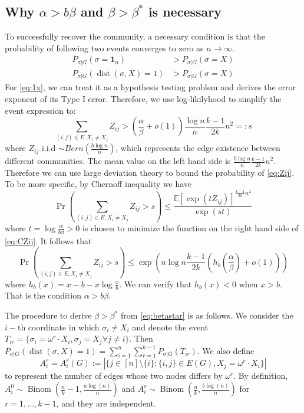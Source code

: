 \label{key}\documentclass[conference]{IEEEtran}
\DeclareMathOperator{\dist}{dist}
\DeclareMathOperator{\Binom}{Binom}
\begin{document}
\subsection{Why $\alpha > b \beta$ and $\beta > \beta^*$ is necessary}
To successfully recover the community, a necessary condition is that the probability of following two events converges to zero as $n\to\infty$.
\begin{align}
P_{\sigma | G}(\sigma =  \mathbf{1}_n) & > P_{\sigma | G}(\sigma = X) \label{eq:1x} \\
P_{\sigma | G}(\dist(\sigma, X) = 1) & > P_{\sigma | G}(\sigma = X)\label{eq:betastar}
\end{align}
For \eqref{eq:1x}, we can treat it as a hypothesis testing problem and derives the error exponent of its Type I error. Therefore, we use log-likilyhood to simplify
the event expression to:
\begin{equation}\label{eq:Zij}
\sum_{(i,j)\in E, X_i \neq X_j} Z_{ij} > (\frac{\alpha}{\beta} + o(1)) \frac{\log n}{n} \frac{k-1}{2k}n^2 =: s
\end{equation}
where $Z_{ij}$ i.i.d $\sim Bern(\frac{b\log n }{n})$, which represents the edge existence between different communities. The mean value on the left hand side is $\frac{b \log n }{n} \frac{k-1}{2k}n^2$. Therefore we can use large
deviation theory to bound the probability of \eqref{eq:Zij}. To be more specific, by Chernoff inequality we have
\begin{equation}\label{eq:CZij}
\Pr\left(\sum_{(i,j)\in E, X_i \neq X_j} Z_{ij} >  s \right)\leq \frac{\mathbb{E}[\exp(t Z_{ij})]^{ \frac{k-1}{2k}n^2 }}{\exp(st)}
\end{equation}
where $ t  = \log \frac{\alpha}{b\beta} > 0$ is chosen to minimize the function on the right hand side of \eqref{eq:CZij}. It follows that
\begin{equation}\label{eq:nlogn}
\Pr\left(\sum_{(i,j)\in E, X_i \neq X_j} Z_{ij} >  s \right)\leq \exp(n\log n  \frac{k-1}{2k} (h_b(\frac{\alpha}{\beta}) + o(1)))
\end{equation}
where $h_b(x) = x - b - x \log\frac{x}{b}$. We can verify that $h_b(x) < 0 $ when $ x > b$. That is the condition $\alpha > b \beta$.

The procedure to derive $\beta > \beta^*$ from \eqref{eq:betastar} is as follows.
We consider the $i-$th coordinate in which $\sigma_i \neq X_i$ and denote the event $T_{ir}=\{\sigma_i = \omega^r \cdot X_i, \sigma_j = X_j \forall j \neq i\}$.
Then $P_{\sigma | G}(\dist(\sigma, X) = 1) = \sum_{i=1}^n\sum_{r=1}^{k-1} P_{\sigma | G}(T_{ir})$.
We also define
\begin{equation*}
A^r_i=A^r_i(G):=|\{j\in[n]\setminus\{i\}:\{i,j\}\in E(G), X_j=\omega^r \cdot X_i\} |
\end{equation*}
to represent the number of edges whose two nodes differs by $\omega^r$.
By definition,
$A^0_i\sim \Binom(\frac{n}{k}-1,\frac{a\log(n)}{n})$ and $A^r_i\sim \Binom(\frac{n}{k}, \frac{b\log(n)}{n})$ for $r=1,\dots, k-1$, and they are independent.
\end{document}
